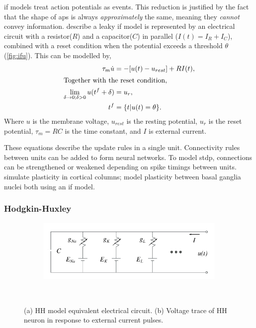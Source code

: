 \acrshort{if} models treat action potentials as events.
This reduction is justified by the fact that the shape of \acrshort{ap}s is always \textit{approximately}
the same, meaning they \textit{cannot} convey information. \cite{gerstner2014if} describe a leaky \acrshort{if} model
is represented by an electrical circuit with a resistor($R$) and a capacitor($C$) in parallel
($I(t) = I_R + I_C$), combined with a reset condition when the potential exceeds a threshold
$\theta$ (\cref{fig:ifu}).
This can be modelled by,
\begin{align}
	\tau_m \dot u                                           & = -[u(t) - u_{rest}] + RI(t),                                    \\
	\intertext{Together with the reset condition,}
	\lim_{\delta \rightarrow 0; \delta > 0} u(t^f + \delta) & = u_r,                                                           \\
	t^f                                                     & = \{t | u(t)                                        = \theta \}.
\end{align}
Where $u$ is the membrane voltage, $u_{rest}$ is the resting potential, $u_r$ is the reset
potential, $\tau_m = RC$ is the time constant, and $I$ is external current.

These equations describe the update rules in a single unit. Connectivity rules between units
can be added to form neural networks. To model \acrshort{stdp}, connections can be strengthened or weakened
depending on spike timings between units. \cite{shupe2021integrate} simulate
plasticity in cortical columns; \cite{kromer2023synaptic} model plasticity between basal ganglia
nuclei both using an \acrshort{if} model.

\subsubsection{Hodgkin-Huxley}

\begin{figure}[ht]
	\centering
	\begin{subfigure}[t]{0.45\textwidth}
		\caption{}
		\hspace{-5mm}
		\includegraphics[height=1.2in]{figs/hh_circuit}
		\label{fig:hhcirc}
	\end{subfigure}
	~
	\begin{subfigure}[t]{0.45\textwidth}
		\caption{}
		\hspace{8mm}
		
		\label{fig:hhu}
	\end{subfigure}
	\caption{(a) HH model equivalent electrical circuit. (b) Voltage trace of HH neuron in response to external current pulses.}
	\label{fig:hh}
\end{figure}

